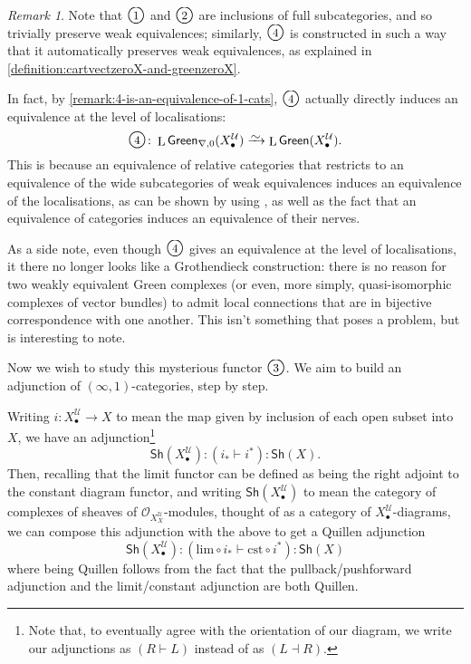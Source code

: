 \documentclass[11pt,fleqn]{article}
\theoremstyle{plain}
\theoremstyle{definition}
\theoremstyle{remark}
\newtheorem{remark}[theorem]{Remark}
\numberwithin{equation}{theorem}
\newcommand{\cover}{\mathcal{U}}
\newcommand{\OO}{\mathcal{O}}
\newcommand{\congto}{\xrightarrow{\raisebox{-.5ex}[0ex][0ex]{$\sim$}}}
\newcommand{\cst}{\mathrm{cst}}
\newcommand{\gshX}{\mathsf{Sh}(X)}
\newcommand{\shX}{\mathsf{Sh}(\nerve{\bullet})}
\newcommand{\greenX}{\mathsf{Green}(X_\bullet^\cover)}
\newcommand{\greenzeroX}{\mathsf{Green}_{\nabla,0}(X_\bullet^\cover)}
\newcommand{\nerve}[1]{X_{#1}^\cover}
\newcommand{\numberincircle}[1]{\text{\Large\textcircled{\small #1}}}
\DeclareMathOperator{\LL}{L}
\begin{document}
        \begin{remark}\label{remark:diagram-descends-to-infty-1-and-4-is-equivalence}
            Note that $\numberincircle{1}$ and $\numberincircle{2}$ are inclusions of full subcategories, and so trivially preserve weak equivalences; similarly, $\numberincircle{4}$ is constructed in such a way that it automatically preserves weak equivalences, as explained in \cref{definition:cartvectzeroX-and-greenzeroX}.

            In fact, by \cref{remark:4-is-an-equivalence-of-1-cats}, $\numberincircle{4}$ actually directly induces an equivalence at the level of localisations:
            \[
                \numberincircle{4}\colon
                \LL{\greenzeroX}
                \congto
                \LL{\greenX}.
            \]
            This is because an equivalence of relative categories that restricts to an equivalence of the wide subcategories of weak equivalences induces an equivalence of the localisations, as can be shown by using \cite[Lemma~5.4]{Barwick&Kan2012}, as well as the fact that an equivalence of categories induces an equivalence of their nerves.
    
            As a side note, even though $\numberincircle{4}$ gives an equivalence at the level of localisations, it there no longer looks like a Grothendieck construction: there is no reason for two weakly equivalent Gre{}en complexes (or even, more simply, quasi-isomorphic complexes of vector bundles) to admit local connections that are in bijective correspondence with one another.
            This isn't something that poses a problem, but is interesting to note.
        \end{remark}

        \bigskip

        Now we wish to study this mysterious functor $\numberincircle{3}$.
        We aim to build an adjunction of $(\infty,1)$-categories, step by step.

        Writing $i\colon\nerve{\bullet}\to X$ to mean the map given by inclusion of each open subset into $X$, we have an adjunction\footnote{Note that, to eventually agree with the orientation of our diagram, we write our adjunctions as $(R\vdash L)$ instead of as $(L\dashv R)$.}
        \begin{equation*}
            \shX : (i_* \vdash i^*) : \gshX.
        \end{equation*}
        Then, recalling that the limit functor can be defined as being the right adjoint to the constant diagram functor, and writing $\shX$ to mean the category of complexes of sheaves of $\OO_{\nerve{X}}$-modules, thought of as a category of $\nerve{\bullet}$-diagrams, we can compose this adjunction with the above to get a Quillen adjunction
        \begin{equation*}
            \shX : (\mathrm{lim}\circ i_* \vdash \cst\circ i^*) : \gshX
        \end{equation*}
        where being Quillen follows from the fact that the pullback/pushforward adjunction and the limit/constant adjunction are both Quillen.
\end{document}
